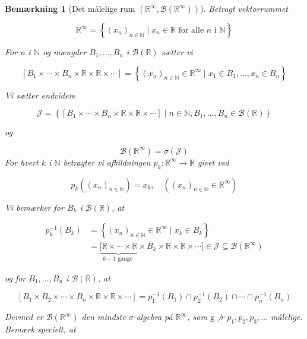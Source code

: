 \documentclass{article}
\newcommand{\R}{\mathbb{R}}
\newcommand{\1}{\mathbbm{1}}
\newtheorem{remark}[theorem]{Bemærkning}
\theoremstyle{boxed}
\begin{document}
\begin{remark}[Det målelige rum $(\R^{\infty},\mathcal{B}(\R^{\infty}))$]
    Betragt vektorrummet

$$
\mathbb{R}^{\infty}=\left\{\left(x_n\right)_{n \in \mathbb{N}} \mid x_n \in \mathbb{R} \text { for alle } n \text { i } \mathbb{N}\right\}
$$


For $n$ i $\mathbb{N}$ og mængder $B_1, \ldots, B_n$ i $\mathcal{B}(\mathbb{R})$ sætter vi

$$
\left[B_1 \times \cdots \times B_n \times \mathbb{R} \times \mathbb{R} \times \cdots\right]=\left\{\left(x_n\right)_{n \in \mathbb{N}} \in \mathbb{R}^{\infty} \mid x_1 \in B_1, \ldots, x_n \in B_n\right\}
$$


Vi sætter endvidere

$$
\mathcal{J}=\left\{\left[B_1 \times \cdots \times B_n \times \mathbb{R} \times \mathbb{R} \times \cdots\right] \mid n \in \mathbb{N}, B_1, \ldots, B_n \in \mathcal{B}(\mathbb{R})\right\}
$$

og

$$
\mathcal{B}\left(\mathbb{R}^{\infty}\right)=\sigma(\mathcal{J})
$$
For hvert $k$ i $\mathbb{N}$ betragter vi afbildningen $p_k: \mathbb{R}^{\infty} \rightarrow \mathbb{R}$ givet ved

$$
p_k\left(\left(x_n\right)_{n \in \mathbb{N}}\right)=x_k, \quad\left(\left(x_n\right)_{n \in \mathbb{N}} \in \mathbb{R}^{\infty}\right)
$$


Vi bemærker for $B_k$ i $\mathcal{B}(\mathbb{R})$, at

$$
\begin{aligned}
p_k^{-1}\left(B_k\right) & =\left\{\left(x_n\right)_{n \in \mathbb{N}} \in \mathbb{R}^{\infty} \mid x_k \in B_k\right\} \\
& =\underbrace{[\mathbb{R} \times \cdots \times \mathbb{R}}_{k-1 \text { gange }} \times B_k \times \mathbb{R} \times \mathbb{R} \times \cdots] \in \mathcal{J} \subseteq \mathcal{B}\left(\mathbb{R}^{\infty}\right)
\end{aligned}
$$

og for $B_1, \ldots, B_n$ i $\mathcal{B}(\mathbb{R})$, at

$$
\left[B_1 \times B_2 \times \cdots \times B_n \times \mathbb{R} \times \mathbb{R} \times \cdots\right]=p_1^{-1}\left(B_1\right) \cap p_2^{-1}\left(B_2\right) \cap \cdots \cap p_n^{-1}\left(B_n\right)
$$


Dermed er $\mathcal{B}\left(\mathbb{R}^{\infty}\right)$ den mindste $\sigma$-algebra på $\mathbb{R}^{\infty}$, som $\mathrm{g} \not$ r $p_1, p_2, p_3, \ldots$ målelige.
Bemærk specielt, at


\end{remark}
\end{document}
